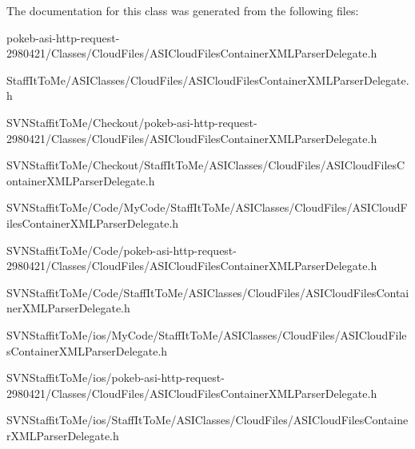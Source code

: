 \-The documentation for this class was generated from the following files\-:\begin{DoxyCompactItemize}
\item 
pokeb-\/asi-\/http-\/request-\/2980421/\-Classes/\-Cloud\-Files/\-A\-S\-I\-Cloud\-Files\-Container\-X\-M\-L\-Parser\-Delegate.\-h\item 
\-Staff\-It\-To\-Me/\-A\-S\-I\-Classes/\-Cloud\-Files/\-A\-S\-I\-Cloud\-Files\-Container\-X\-M\-L\-Parser\-Delegate.\-h\item 
\-S\-V\-N\-Staffit\-To\-Me/\-Checkout/pokeb-\/asi-\/http-\/request-\/2980421/\-Classes/\-Cloud\-Files/\-A\-S\-I\-Cloud\-Files\-Container\-X\-M\-L\-Parser\-Delegate.\-h\item 
\-S\-V\-N\-Staffit\-To\-Me/\-Checkout/\-Staff\-It\-To\-Me/\-A\-S\-I\-Classes/\-Cloud\-Files/\-A\-S\-I\-Cloud\-Files\-Container\-X\-M\-L\-Parser\-Delegate.\-h\item 
\-S\-V\-N\-Staffit\-To\-Me/\-Code/\-My\-Code/\-Staff\-It\-To\-Me/\-A\-S\-I\-Classes/\-Cloud\-Files/\-A\-S\-I\-Cloud\-Files\-Container\-X\-M\-L\-Parser\-Delegate.\-h\item 
\-S\-V\-N\-Staffit\-To\-Me/\-Code/pokeb-\/asi-\/http-\/request-\/2980421/\-Classes/\-Cloud\-Files/\-A\-S\-I\-Cloud\-Files\-Container\-X\-M\-L\-Parser\-Delegate.\-h\item 
\-S\-V\-N\-Staffit\-To\-Me/\-Code/\-Staff\-It\-To\-Me/\-A\-S\-I\-Classes/\-Cloud\-Files/\-A\-S\-I\-Cloud\-Files\-Container\-X\-M\-L\-Parser\-Delegate.\-h\item 
\-S\-V\-N\-Staffit\-To\-Me/ios/\-My\-Code/\-Staff\-It\-To\-Me/\-A\-S\-I\-Classes/\-Cloud\-Files/\-A\-S\-I\-Cloud\-Files\-Container\-X\-M\-L\-Parser\-Delegate.\-h\item 
\-S\-V\-N\-Staffit\-To\-Me/ios/pokeb-\/asi-\/http-\/request-\/2980421/\-Classes/\-Cloud\-Files/\-A\-S\-I\-Cloud\-Files\-Container\-X\-M\-L\-Parser\-Delegate.\-h\item 
\-S\-V\-N\-Staffit\-To\-Me/ios/\-Staff\-It\-To\-Me/\-A\-S\-I\-Classes/\-Cloud\-Files/\-A\-S\-I\-Cloud\-Files\-Container\-X\-M\-L\-Parser\-Delegate.\-h\end{DoxyCompactItemize}
